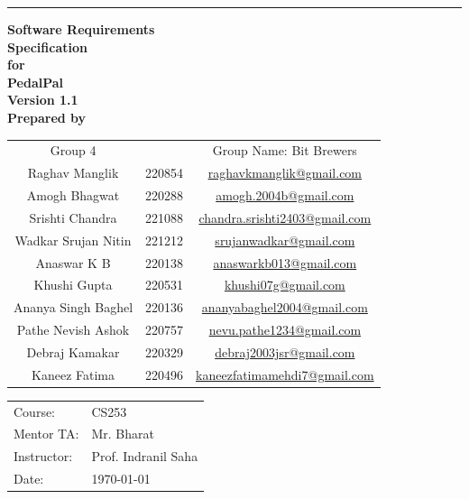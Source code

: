\documentclass{scrreprt}
\begin{document}
\begin{flushright}
    \rule{16cm}{5pt}\vskip1cm
    \textbf{{\fontsize{40}{48}\selectfont Software Requirements}\\ {\fontsize{40}{48}\selectfont Specification}\\\vspace{1cm}\huge{for}\\\vspace{1cm}\Huge{PedalPal}\\ \vspace{1.5cm}\huge{Version 1.1}\\\vspace{1cm}\huge{Prepared by}}
\end{flushright}
\vspace{1.0cm}
\large{\begin{tabular*}{\columnwidth}{@{\extracolsep{\stretch{1}}}*{3}{c}@{}}
    \Large{Group 4} & & \Large{Group Name: Bit Brewers} \\
    Raghav Manglik & 220854 & \href{mailto:raghavkmanglik@gmail.com}{raghavkmanglik@gmail.com} \\
    Amogh Bhagwat & 220288 & \href{mailto:amogh.2004b@gmail.com}{amogh.2004b@gmail.com} \\
    Srishti Chandra & 221088 & \href{mailto:chandra.srishti2403@gmail.com}{chandra.srishti2403@gmail.com} \\
    Wadkar Srujan Nitin & 221212 & \href{mailto:srujanwadkar@gmail.com}{srujanwadkar@gmail.com} \\
    Anaswar K B & 220138 & \href{mailto:anaswarkb013@gmail.com}{anaswarkb013@gmail.com} \\
    Khushi Gupta & 220531 & \href{mailto:khushi07g@gmail.com}{khushi07g@gmail.com} \\
    Ananya Singh Baghel & 220136 & \href{mailto:ananyabaghel2004@gmail.com}{ananyabaghel2004@gmail.com} \\
    Pathe Nevish Ashok & 220757 & \href{mailto:nevu.pathe1234@gmail.com}{nevu.pathe1234@gmail.com} \\
    Debraj Kamakar & 220329 & \href{mailto:debraj2003jsr@gmail.com}{debraj2003jsr@gmail.com} \\
    Kaneez Fatima & 220496 & \href{mailto:kaneezfatimamehdi7@gmail.com}{kaneezfatimamehdi7@gmail.com} \\
    
\end{tabular*}}

\vspace{2.0cm}
\begin{center}
\large{
\begin{tabular}{l l}
    Course: & CS253 \\
    Mentor TA: & Mr. Bharat \\
    Instructor: & Prof. Indranil Saha \\
    Date: & \today
\end{tabular}
}
\end{center}
\end{document}
